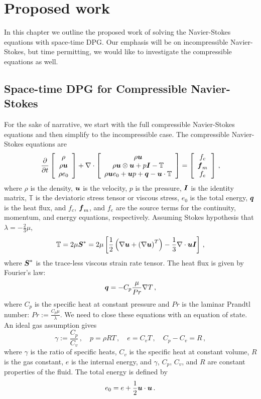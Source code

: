 \documentclass[Proposal.tex]{subfiles}
\begin{document}
\chapter{Proposed work}
In this chapter we outline the proposed work of solving the Navier-Stokes equations with space-time DPG. 
Our emphasis will be on incompressible Navier-Stokes, but time permitting, we would like to investigate the compressible equations as well.


\section{Space-time DPG for Compressible Navier-Stokes}
For the sake of narrative, we start with the full compressible Navier-Stokes equations and then simplify to the incompressible case.
The compressible Navier-Stokes equations are
\begin{align}
\frac{\partial}{\partial t}\left[ \begin{array}{c} \rho\\ \rho\boldsymbol u\\ \rho e_0\\ \end{array} \right]
+\nabla\cdot\left[ \begin{array}{c} \rho\boldsymbol u\\ \rho\boldsymbol u\otimes\boldsymbol u+p\boldsymbol I-\mathbb{T}\\ \rho\boldsymbol u e_0+\boldsymbol u p+\boldsymbol q-\boldsymbol u\cdot\mathbb{T}\\ \end{array} \right]
=\left[ \begin{array}{c} f_c\\ \boldsymbol f_m\\ f_e\\ \end{array} \right]\,,
\end{align}
where $\rho$ is the density, $\boldsymbol u$ is the velocity, $p$ is the pressure, $\boldsymbol I$ is the identity matrix,
$\mathbb{T}$ is the deviatoric stress tensor or viscous stress, $e_0$ is the total energy, $\boldsymbol q$ is the heat flux, 
and $f_c$, $\boldsymbol f_m$, and $f_e$ are the source terms for the continuity, momentum, and energy equations, respectively.
Assuming Stokes hypothesis that $\lambda=-\frac{2}{3}\mu$, 
\begin{equation*}
	\mathbb{T}=2\mu\boldsymbol S^*=2\mu\left[ \frac{1}{2}\left( \nabla\boldsymbol u+\left( \nabla\boldsymbol u \right)^T \right)-\frac{1}{3}\nabla\cdot\boldsymbol u\boldsymbol I \right]\,,
\end{equation*}
where $\boldsymbol S^*$ is the trace-less viscous strain rate tensor.
The heat flux is given by Fourier's law:
\begin{equation*}
	\boldsymbol q=-C_p\frac{\mu}{Pr}\nabla T\,,
\end{equation*}
where $C_p$ is the specific heat at constant pressure and $Pr$ is the laminar Prandtl number: $Pr:=\frac{C_p\mu}{\lambda}$.
We need to close these equations with an equation of state. An ideal gas assumption gives
\begin{equation*}
	\gamma:=\frac{C_p}{C_v}\,,\quad p=\rho RT\,,\quad e=C_v T\,,\quad C_p-C_v=R\,,
\end{equation*}
where $\gamma$ is the ratio of specific heats, $C_v$ is the specific heat at constant volume, $R$ is the gas constant, $e$ is the internal energy,
and $\gamma$, $C_p$, $C_v$, and $R$ are constant properties of the fluid.
The total energy is defined by
\begin{equation*}
	e_0=e+\frac{1}{2}\boldsymbol u\cdot\boldsymbol u\,.
\end{equation*}
\end{document}
